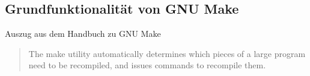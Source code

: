 \subsection{Grundfunktionalität von GNU Make}
\begin{frame}
	Auszug aus dem Handbuch zu GNU Make
	\begin{quote}
		The make utility automatically determines which pieces of a large
		program need to be recompiled, and issues commands to recompile them.
	\end{quote}
\end{frame}
